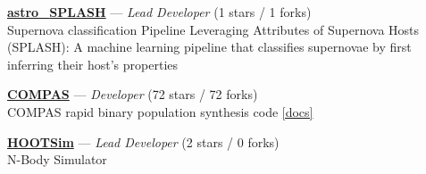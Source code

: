 \item \href{https://github.com/Adam-Boesky/astro_SPLASH}{{\bf astro{\_}SPLASH}} --- \textit{Lead Developer} (1 stars / 1 forks) \\
Supernova classification Pipeline Leveraging Attributes of Supernova Hosts (SPLASH): A machine learning pipeline that classifies supernovae by first inferring their host's properties 

\item \href{https://github.com/TeamCOMPAS/COMPAS}{{\bf COMPAS}} --- \textit{Developer} (72 stars / 72 forks) \\
COMPAS rapid binary population synthesis code \href{http://compas.science}{[docs]}

\item \href{https://github.com/jdinovi/HOOTSim}{{\bf HOOTSim}} --- \textit{Lead Developer} (2 stars / 0 forks) \\
N-Body Simulator 